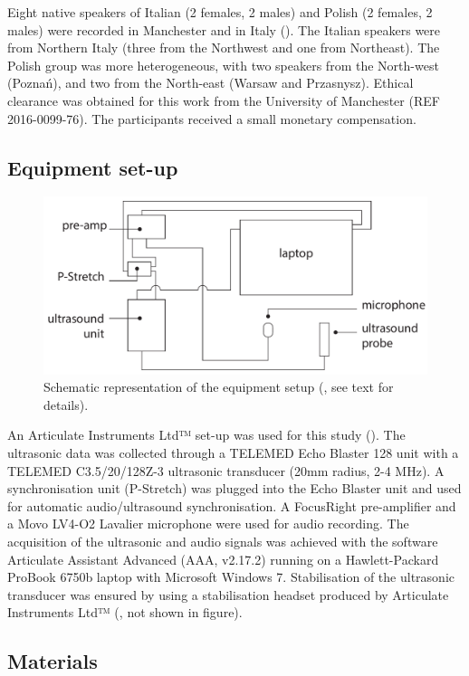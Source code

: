 \documentclass[authoryear, twocolumn]{elsarticle}
\begin{document}
Eight native speakers of Italian (2 females, 2 males) and Polish (2
females, 2 males) were recorded in Manchester and in Italy
(). The Italian speakers were from Northern Italy
(three from the Northwest and one from Northeast). The Polish group was
more heterogeneous, with two speakers from the North-west (Poznań), and
two from the North-east (Warsaw and Przasnysz). Ethical clearance was
obtained for this work from the University of Manchester (REF
2016-0099-76). The participants received a small monetary compensation.

\subsection{Equipment set-up}\label{equipment-set-up}

\begin{figure}
    \centering
    \includegraphics[width=.7\textwidth]{../../graphics/uti-setup.pdf}
    \caption{Schematic representation of the equipment setup (\citealt{articulate2011}, see text for details).}
    \label{f:uti-setup}
\end{figure}

An Articulate Instruments Ltd™ set-up was used for this study
(). The ultrasonic data was collected through a
TELEMED Echo Blaster 128 unit with a TELEMED C3.5/20/128Z-3 ultrasonic
transducer (20mm radius, 2-4 MHz). A synchronisation unit (P-Stretch)
was plugged into the Echo Blaster unit and used for automatic
audio/ultrasound synchronisation. A FocusRight pre-amplifier and a Movo
LV4-O2 Lavalier microphone were used for audio recording. The
acquisition of the ultrasonic and audio signals was achieved with the
software Articulate Assistant Advanced (AAA, v2.17.2) running on a
Hawlett-Packard ProBook 6750b laptop with Microsoft Windows 7.
Stabilisation of the ultrasonic transducer was ensured by using a
stabilisation headset produced by Articulate Instruments Ltd™
(\citealt{articulate2008}, not shown in figure).

\subsection{Materials}\label{materials}
\end{document}

